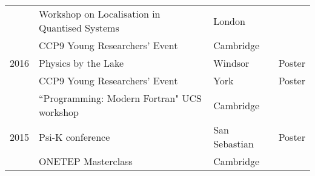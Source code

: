 \documentclass[10pt,a4paper,final]{article}
\begin{document}
\begin{tabularx}{\textwidth}{
      m{}%
      m{}%
      m{}%
      m{}}
                 & Workshop on Localisation in Quantised Systems               & London            &                       \\
                 & CCP9 Young Researchers' Event                               & Cambridge         &                       \\
   {2016}        & Physics by the Lake                                         & Windsor           & Poster                \\
                 & CCP9 Young Researchers' Event                               & York              & Poster                \\
                 & ``Programming: Modern Fortran" UCS workshop                 & Cambridge         &                       \\
   {2015}        & Psi-K conference                                            & San Sebastian     & Poster                \\
                 & ONETEP Masterclass                                          & Cambridge         &
\end{tabularx}
%
\end{document}

